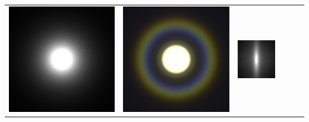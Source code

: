 \begin{teaserfigure}
\begin{tabular}{cccccc}
        \includegraphics[height=\resLen]{images/slab/N100_500nm.jpg} &
        \includegraphics[height=\resLen]{images/slab/color.jpg} & 
        \includegraphics[height=\resLen]{images/slab/aniso_y.jpg} &

\end{tabular}
\end{teaserfigure}
